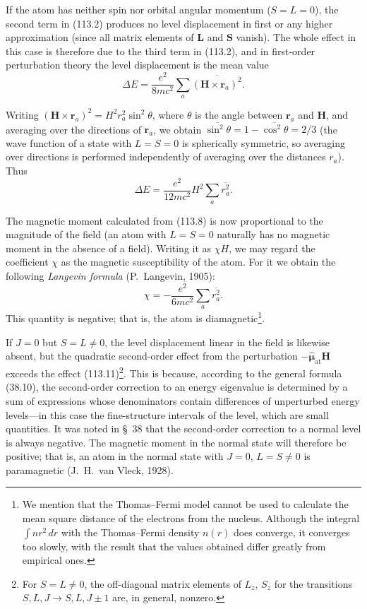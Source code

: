 If the atom has neither spin nor orbital angular momentum ($S=L=0$), the second term in (113.2) produces no level displacement in first or any higher approximation (since all matrix elements of $\mathbf L$ and $\mathbf S$ vanish). The whole effect in this case is therefore due to the third term in (113.2), and in first-order perturbation theory the level displacement is the mean value
\begin{equation}
 \Delta E=\frac{e^2}{8mc^2}\sum_a\overline{(\mathbf H\times\mathbf r_a)^2}.
 \tag{113.10}
\end{equation}

Writing $(\mathbf H\times\mathbf r_a)^2=H^2r_a^2\sin^2\theta$, where $\theta$ is the angle between $\mathbf r_a$ and $\mathbf H$, and averaging over the directions of $\mathbf r_a$, we obtain $\overline{\sin^2\theta}=1-\overline{\cos^2\theta}=2/3$ (the wave function of a state with $L=S=0$ is spherically symmetric, so averaging over directions is performed independently of averaging over the distances $r_a$). Thus
\begin{equation}
 \Delta E=\frac{e^2}{12mc^2}H^2\sum_a\overline{r_a^2}.
 \tag{113.11}
\end{equation}

The magnetic moment calculated from (113.8) is now proportional to the magnitude of the field (an atom with $L=S=0$ naturally has no magnetic moment in the absence of a field). Writing it as $\chi H$, we may regard the coefficient $\chi$ as the magnetic susceptibility of the atom. For it we obtain the following \emph{Langevin formula} (P.~Langevin, 1905):
\begin{equation}
 \chi=-\frac{e^2}{6mc^2}\sum_a\overline{r_a^2}.
 \tag{113.12}
\end{equation}
This quantity is negative; that is, the atom is diamagnetic\footnote{We mention that the Thomas--Fermi model cannot be used to calculate the mean square distance of the electrons from the nucleus. Although the integral $\int nr^2\,dr$ with the Thomas--Fermi density $n(r)$ does converge, it converges too slowly, with the result that the values obtained differ greatly from empirical ones.}.

If $J=0$ but $S=L\ne0$, the level displacement linear in the field is likewise absent, but the quadratic second-order effect from the perturbation $-\hat{\boldsymbol\mu}_{\text{at}}\mathbf H$ exceeds the effect (113.11)\footnote{For $S=L\ne0$, the off-diagonal matrix elements of $L_z$, $S_z$ for the transitions $S,L,J\to S,L,J\pm1$ are, in general, nonzero.}. This is because, according to the general formula (38.10), the second-order correction to an energy eigenvalue is determined by a sum of expressions whose denominators contain differences of unperturbed energy levels---in this case the fine-structure intervals of the level, which are small quantities. It was noted in §~38 that the second-order correction to a normal level is always negative. The magnetic moment in the normal state will therefore be positive; that is, an atom in the normal state with $J=0$, $L=S\ne0$ is paramagnetic (J.~H.~van Vleck, 1928).

